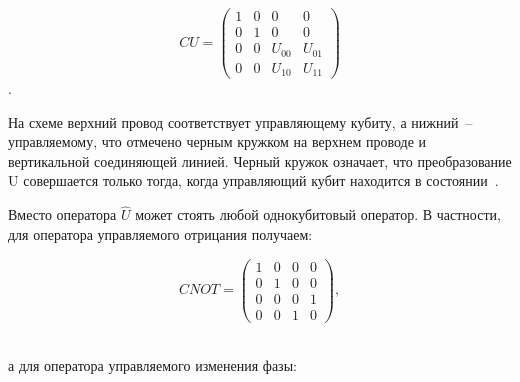 \documentclass[pscyr,notitlepage]{hedwork}
\renewcommand{\~}[1]{\widetilde{#1}}
\begin{document}
  \begin{minipage}{.4\textwidth}
    \center
  \end{minipage}
  \begin{minipage}{.4\textwidth}
    \[
      CU =
      \begin{pmatrix}
        1 & 0 & 0      & 0      \\[-1.7ex]
        0 & 1 & 0      & 0      \\[-1.7ex]
        0 & 0 & U_{00} & U_{01} \\[-1.7ex]
        0 & 0 & U_{10} & U_{11}
      \end{pmatrix}
    \].
  \end{minipage}
  
  На схеме верхний провод соответствует управляющему кубиту, а нижний~--
  управляемому, что отмечено черным кружком на верхнем проводе и вертикальной
  соединяющей линией. Черный кружок означает, что преобразование U совершается
  только тогда, когда управляющий кубит находится в состоянии~.
  
  Вместо оператора \( \hat{U} \) может стоять любой однокубитовый оператор.
  В частности, для оператора управляемого отрицания получаем:
  
  \begin{minipage}{.4\textwidth}
    \center
  \end{minipage}
  \begin{minipage}{.42\textwidth}
    \[
      CNOT =
      \begin{pmatrix}
        1 & 0 & 0 & 0 \\[-1.7ex]
        0 & 1 & 0 & 0 \\[-1.7ex]
        0 & 0 & 0 & 1 \\[-1.7ex]
        0 & 0 & 1 & 0
      \end{pmatrix},
    \]
  \end{minipage} \\  
  а для оператора управляемого изменения фазы:
  
\end{document}
